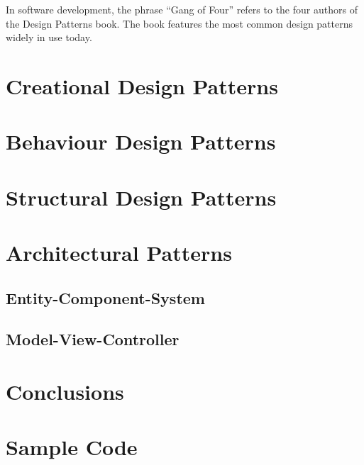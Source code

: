 \documentclass[10pt,letterpaper]{article}
\begin{document}
In software development, the phrase ``Gang of Four'' refers to the four authors of the Design Patterns book. The book features the most common design patterns widely in use today.\\




\section{Creational Design Patterns}

\section{Behaviour Design Patterns}

\section{Structural Design Patterns}

\section{Architectural Patterns}

\subsection{Entity-Component-System}

\subsection{Model-View-Controller}

\section{Conclusions}

\clearpage
{}



\clearpage
\appendix
\section{Sample Code}

\end{document}
